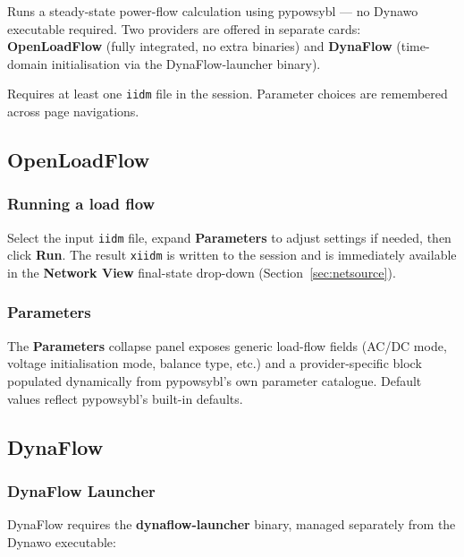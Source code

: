 \documentclass[a4paper,11pt]{article}
\newcommand{\ftype}[1]{\texttt{\small\color{rteblu}#1}}
\begin{document}
Runs a steady-state power-flow calculation using pypowsybl --- no Dynawo
executable required. Two providers are offered in separate cards:
\textbf{OpenLoadFlow} (fully integrated, no extra binaries) and
\textbf{DynaFlow} (time-domain initialisation via the DynaFlow-launcher binary).

Requires at least one \ftype{iidm} file in the session. Parameter choices are
remembered across page navigations.

\subsection{OpenLoadFlow}

\subsubsection{Running a load flow}

Select the input \ftype{iidm} file, expand \textbf{Parameters} to adjust
settings if needed, then click \textbf{Run}. The result \ftype{xiidm} is
written to the session and is immediately available in the \textbf{Network
View} final-state drop-down (Section~\ref{sec:netsource}).

\subsubsection{Parameters}

The \textbf{Parameters} collapse panel exposes generic load-flow fields (AC/DC
mode, voltage initialisation mode, balance type, etc.) and a provider-specific
block populated dynamically from pypowsybl's own parameter catalogue. Default
values reflect pypowsybl's built-in defaults.

\subsection{DynaFlow}

\subsubsection{DynaFlow Launcher}
\label{sec:dynaflowlauncher}

DynaFlow requires the \textbf{dynaflow-launcher} binary, managed separately from
the Dynawo executable:
\end{document}
